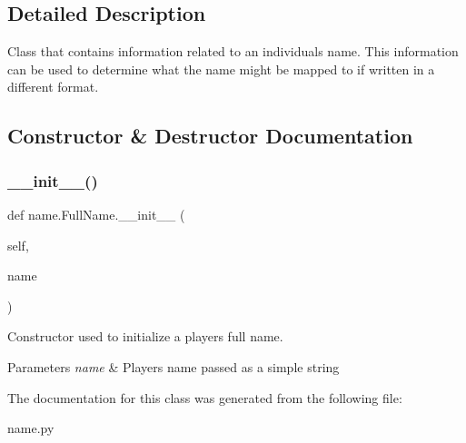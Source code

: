 \subsection{Detailed Description}
\begin{DoxyVerb}Class that contains information related to an individuals name. This information can be used to determine what the name might be mapped to if written in a different format.
\end{DoxyVerb}
 

\subsection{Constructor \& Destructor Documentation}
\mbox{\label{classname_1_1FullName_a28652799b3836b5dbad3504fdc70c34c}} 
\subsubsection{\texorpdfstring{\+\_\+\+\_\+init\+\_\+\+\_\+()}{\_\_init\_\_()}}
{\footnotesize\ttfamily def name.\+Full\+Name.\+\_\+\+\_\+init\+\_\+\+\_\+ (\begin{DoxyParamCaption}\item[{}]{self,  }\item[{}]{name }\end{DoxyParamCaption})}



Constructor used to initialize a player\textquotesingle{}s full name. 


\begin{DoxyParams}{Parameters}
{\em name} & Player\textquotesingle{}s name passed as a simple string \\
\hline
\end{DoxyParams}


The documentation for this class was generated from the following file\+:\begin{DoxyCompactItemize}
\item 
name.\+py\end{DoxyCompactItemize}
